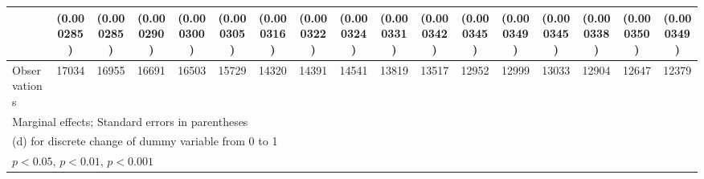 {\begin{tabular}{l*{16}{c}}
                    &  (0.000285)         &  (0.000285)         &  (0.000290)         &  (0.000300)         &  (0.000305)         &  (0.000316)         &  (0.000322)         &  (0.000324)         &  (0.000331)         &  (0.000342)         &  (0.000345)         &  (0.000349)         &  (0.000345)         &  (0.000338)         &  (0.000350)         &  (0.000349)         \\
\hline
Observations        &       17034         &       16955         &       16691         &       16503         &       15729         &       14320         &       14391         &       14541         &       13819         &       13517         &       12952         &       12999         &       13033         &       12904         &       12647         &       12379         \\
\hline\hline
\multicolumn{17}{l}{\footnotesize Marginal effects; Standard errors in parentheses}\\
\multicolumn{17}{l}{\footnotesize  (d) for discrete change of dummy variable from 0 to 1}\\
\multicolumn{17}{l}{\footnotesize \sym{*} \(p<0.05\), \sym{**} \(p<0.01\), \sym{***} \(p<0.001\)}\\
\end{tabular}
}
